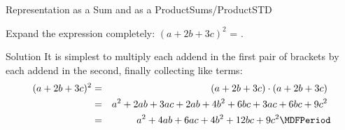 \begin{MXContent}{Representation as a Sum and as a Product}{Sums/Product}{STD}
\begin{MExercise}
Expand the expression completely: $(a+2b+3c)^2$ = .

\begin{MHint}{Solution}
It is simplest to multiply each addend in the first pair of brackets by each addend in the second, 
finally collecting like terms:
\begin{eqnarray*}
(a+2b+3c)^2 & = & (a+2b+3c)\cdot(a+2b+3c)  \ \\
&=& a^2+2a b+3a c+2a b+4b^2+6b c+3a c+6b c+9c^2 \ \\
&=& a^2 +4a b+6a c+4b^2+12b c+9c^2 \MDFPeriod 
\end{eqnarray*}
\end{MHint}
\end{MExercise}

\end{MXContent}


